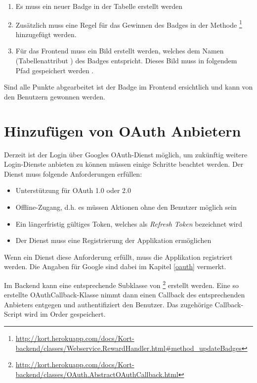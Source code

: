 \begin{enumerate}
\item Es muss ein neuer \gls{Badge} in der Tabelle  erstellt werden
\item Zusätzlich muss eine Regel für das Gewinnen des \gls{Badge}s in der Methode \footnote{\url{http://kort.herokuapp.com/docs/Kort-backend/classes/Webservice.RewardHandler.html\#method_updateBadges}} hinzugefügt werden.
\item Für das Frontend muss ein Bild erstellt werden, welches dem Namen (Tabellenattribut ) des \gls{Badge}s entspricht. Dieses Bild muss in folgendem Pfad gespeichert werden .
\end{enumerate}

Sind alle Punkte abgearbeitet ist der \gls{Badge} im Frontend ersichtlich und kann von den Benutzern gewonnen werden.

\section{Hinzufügen von OAuth Anbietern}
\label{kort-additional-oauth-provider}
Derzeit ist der Login über Googles \gls{OAuth}-Dienst möglich, um zukünftig weitere Login-Dienste anbieten zu können müssen einige Schritte beachtet werden.
Der Dienst muss folgende Anforderungen erfüllen:
\begin{itemize}
\item Unterstützung für OAuth 1.0 oder 2.0
\item Offline-Zugang, d.h. es müssen Aktionen ohne den Benutzer möglich sein
\item Ein längerfristig gültiges Token, welches als \emph{Refresh Token} bezeichnet wird
\item Der Dienst muss eine Registrierung der Applikation ermöglichen
\end{itemize}

Wenn ein Dienst diese Anforderung erfüllt, muss die Applikation registriert werden.
Die Angaben für Google sind dabei im Kapitel \ref{oauth} vermerkt.

Im Backend kann eine entsprechende Subklasse von \footnote{\url{http://kort.herokuapp.com/docs/Kort-backend/classes/OAuth.AbstractOAuthCallback.html}} erstellt werden. 
Eine so erstellte OAuthCallback-Klasse nimmt dann einen Callback des entsprechenden Anbieters entgegen und authentifiziert den Benutzer.
Das zugehörige Callback-Script wird im Order  gespeichert.

